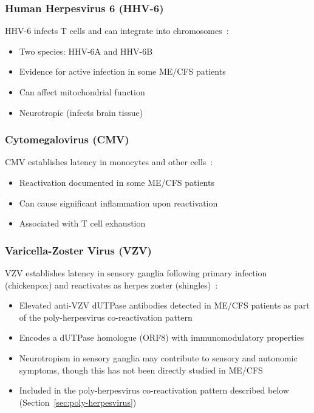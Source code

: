 \subsubsection{Human Herpesvirus 6 (HHV-6)}

HHV-6 infects T cells and can integrate into chromosomes~\cite{EatonFitch2019}:
\begin{itemize}
    \item Two species: HHV-6A and HHV-6B
    \item Evidence for active infection in some ME/CFS patients~\cite{EatonFitch2019}
    \item Can affect mitochondrial function
    \item Neurotropic (infects brain tissue)
\end{itemize}

\subsubsection{Cytomegalovirus (CMV)}

CMV establishes latency in monocytes and other cells~\cite{EatonFitch2019}:
\begin{itemize}
    \item Reactivation documented in some ME/CFS patients~\cite{EatonFitch2019}
    \item Can cause significant inflammation upon reactivation
    \item Associated with T cell exhaustion~\cite{iu2024tcell_exhaustion}
\end{itemize}

\subsubsection{Varicella-Zoster Virus (VZV)}

VZV establishes latency in sensory ganglia following primary infection (chickenpox) and reactivates as herpes zoster (shingles)~\cite{Ariza2025polyherpesvirus}:
\begin{itemize}
    \item Elevated anti-VZV dUTPase antibodies detected in ME/CFS patients as part of the poly-herpesvirus co-reactivation pattern~\cite{Palomo2026herpesvirus}
    \item Encodes a dUTPase homologue (ORF8) with immunomodulatory properties~\cite{Ariza2025polyherpesvirus}
    \item Neurotropism in sensory ganglia may contribute to sensory and autonomic symptoms, though this has not been directly studied in ME/CFS
    \item Included in the poly-herpesvirus co-reactivation pattern described below (Section~\ref{sec:poly-herpesvirus})
\end{itemize}

